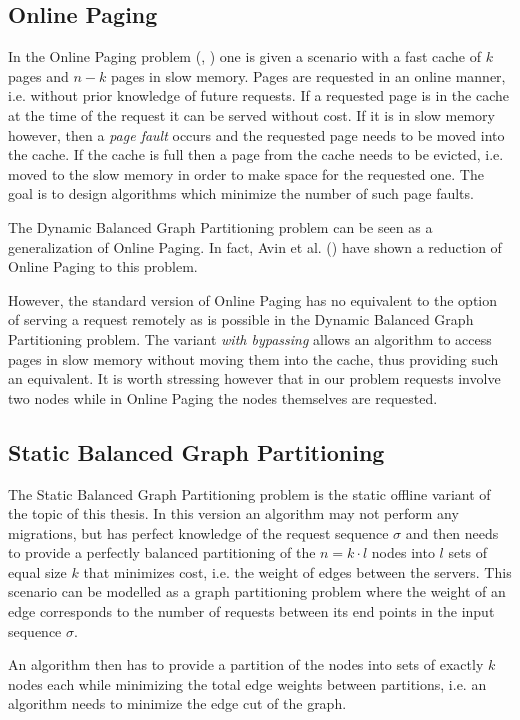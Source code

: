 \documentclass[a4paper, 10pt]{article}
\theoremstyle{definition}
\begin{document}
	\subsection{Online Paging}
	In the Online Paging problem (\cite{Fiat2002}, \cite{Epstein2011}) one is given a scenario with a fast cache of $k$ pages and $n-k$ pages in slow memory. Pages are requested in an online manner, i.e. without prior knowledge of future requests. If a requested page is in the cache at the time of the request it can be served without cost. If it is in slow memory however, then a \textit{page fault} occurs and the requested page needs to be moved into the cache. If the cache is full then a page from the cache needs to be evicted, i.e. moved to the slow memory in order to make space for the requested one. The goal is to design algorithms which minimize the number of such page faults. 
	
	The Dynamic Balanced Graph Partitioning problem can be seen as a generalization of Online Paging. In fact, Avin et al. (\cite{Avin2015}) have shown a reduction of Online Paging to this problem.
	
	However, the standard version of Online Paging has no equivalent to the option of serving a request remotely as is possible in the Dynamic Balanced Graph Partitioning problem. The variant \textit{with bypassing} allows an algorithm to access pages in slow memory without moving them into the cache, thus providing such an equivalent. It is worth stressing however that in our problem requests involve two nodes while in Online Paging the nodes themselves are requested.
	
	
	\subsection{Static Balanced Graph Partitioning}
	The Static Balanced Graph Partitioning problem is the static offline variant of the topic of this thesis. In this version an algorithm may not perform any migrations, but has perfect knowledge of the request sequence $\sigma$ and then needs to provide a perfectly balanced partitioning of the $n=k\cdot l$ nodes into $l$ sets of equal size $k$ that minimizes cost, i.e. the weight of edges between the servers. This scenario can be modelled as a graph partitioning problem where the weight of an edge corresponds to the number of requests between its end points in the input sequence $\sigma$. 
	
	An algorithm then has to provide a partition of the nodes into sets of exactly $k$ nodes each while minimizing the total edge weights between partitions, i.e. an algorithm needs to minimize the edge cut of the graph.  
	
\end{document}
